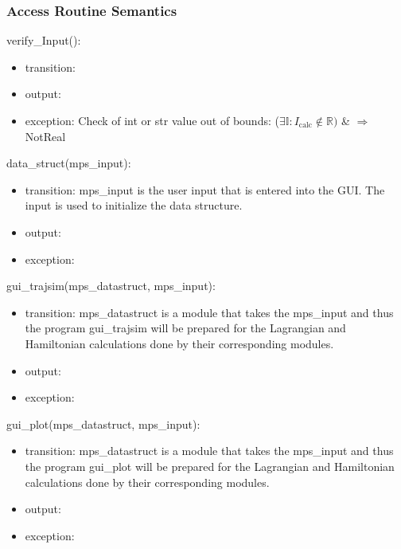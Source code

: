 \documentclass[12pt, titlepage]{article}
\begin{document}

\subsubsection{Access Routine Semantics}

\noindent verify\_Input():
\begin{itemize}
\item transition:  
\item output:  
\item exception: Check of int or str value out of bounds: 
($\exists \mathbb{I}:I_{\text{calc}} \notin \mathbb{R})$ \& $\Rightarrow$
NotReal  \\
\end{itemize}

\noindent data\_struct(mps\_input):
\begin{itemize}
\item transition: mps\_input is the user input that is entered into the GUI. 
The input is used to initialize the data structure. 
\item output:  
\item exception:  
\end{itemize}

\noindent gui\_trajsim(mps\_datastruct, mps\_input):
\begin{itemize}
\item transition: mps\_datastruct is a module that takes the mps\_input and 
thus the program gui\_trajsim will be prepared for the Lagrangian and 
Hamiltonian calculations done by their corresponding modules.
\item output:  
\item exception:  
\end{itemize}

\noindent gui\_plot(mps\_datastruct, mps\_input):
\begin{itemize}
\item transition: mps\_datastruct is a module that takes the mps\_input and 
thus the program gui\_plot will be prepared for the Lagrangian and Hamiltonian 
calculations done by their corresponding modules.
\item output:  
\item exception:  
\end{itemize}
\end{document}
